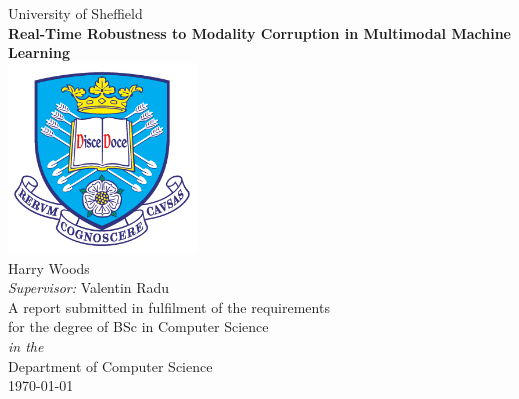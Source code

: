 
\begin{titlepage}

\begin{center}
{\LARGE University of Sheffield}\\[1.5cm]
\linespread{1.2}\huge {\bfseries Real-Time Robustness to Modality Corruption in Multimodal Machine Learning}\\[1.5cm]
\linespread{1}
\includegraphics[width=5cm]{images/tuoslogo.png}\\[1cm]
{\Large Harry Woods}\\[1cm]
{\large \emph{Supervisor:} Valentin Radu}\\[1cm]
\large A report submitted in fulfilment of the requirements\\ for the degree of BSc in Computer Science\\[0.3cm] 
\textit{in the}\\[0.3cm]
Department of Computer Science\\[1.5cm]
\today
\end{center}

\end{titlepage}